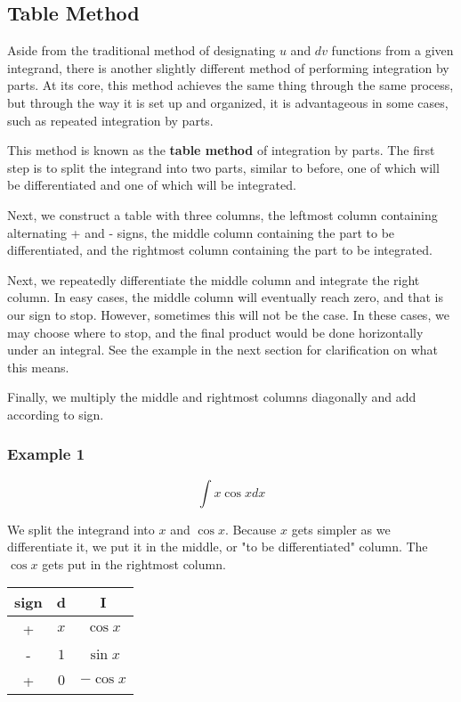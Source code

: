\documentclass[11pt]{article}
\begin{document}
\subsection{Table Method}
Aside from the traditional method of designating $u$ and $dv$ functions from a given integrand, there is another slightly different method of performing integration by parts. At its core, this method achieves the same thing through the same process, but through the way it is set up and organized, it is advantageous in some cases, such as repeated integration by parts.

This method is known as the \textbf{table method} of integration by parts. The first step is to split the integrand into two parts, similar to before, one of which will be differentiated and one of which will be integrated. 

Next, we construct a table with three columns, the leftmost column containing alternating + and - signs, the middle column containing the part to be differentiated, and the rightmost column containing the part to be integrated. 

Next, we repeatedly differentiate the middle column and integrate the right column. In easy cases, the middle column will eventually reach zero, and that is our sign to stop. However, sometimes this will not be the case. In these cases, we may choose where to stop, and the final product would be done horizontally under an integral. See the example in the next section for clarification on what this means.

Finally, we multiply the middle and rightmost columns diagonally and add according to sign. 

\subsubsection*{Example 1}

\[ \int x \cos x dx\]

We split the integrand into $x$ and $\cos x$. Because $x$ gets simpler as we differentiate it, we put it in the middle, or "to be differentiated" column. The $\cos x$ gets put in the rightmost column.

\begin{table}[H]
    \centering
    \begin{tabular}{c|c|c}
        sign & d & I \\
        \hline
        + & $x$ & $\cos x$ \\
        - & $1$ & $\sin x$\\
        + & $0$ & $-\cos x$ 
    \end{tabular}
\end{table}
\end{document}
